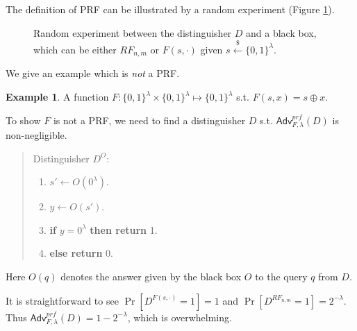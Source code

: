 \documentclass[12pt]{article}
\newcommand{\bits}{\{0,1\}}
\newcommand{\getsr}{\stackrel{\$}{\gets}}
\newcommand{\Adv}{\mathsf{Adv}}
\theoremstyle{definition}
\newtheorem{example}[theorem]{Example}
\begin{document}
The definition of PRF can be illustrated by a random experiment (Figure \ref{fig:re}).

\begin{figure}[!t]
\centering{}
\caption{Random experiment between the distinguisher $D$ and a black box, which can be either $RF_{n,m}$ or $F(s,\cdot)$ given $s\getsr\bits^\lambda$.}
\label{fig:re}
\end{figure}

We give an example which is \emph{not} a PRF.
\begin{example}
A function $F : \bits^\lambda \times \bits^\lambda \mapsto \bits^{\lambda}$ s.t. $F(s,x) = s \oplus x$.

To show $F$ is not a PRF, we need to find a distinguisher $D$ s.t. $\Adv_{F,\lambda}^{prf}(D)$ is non-negligible.
\begin{quote}
Distinguisher $D^O$:
\begin{enumerate}
\item $s' \gets O(0^\lambda)$.
\item $y \gets O(s')$.
\item {\bf if} $y=0^\lambda$ {\bf then return} 1.
\item {\bf else return} 0.
\end{enumerate}
\end{quote}
Here $O(q)$ denotes the answer given by the black box $O$ to the query $q$ from $D$.

It is straightforward to see $\Pr[D^{F(s,\cdot)}=1]=1$ and $\Pr[D^{RF_{n,m}}=1]=2^{-\lambda}$. Thus $\Adv_{F,\lambda}^{prf}(D)=1-2^{-\lambda}$, which is overwhelming.
\end{example}
\end{document}
